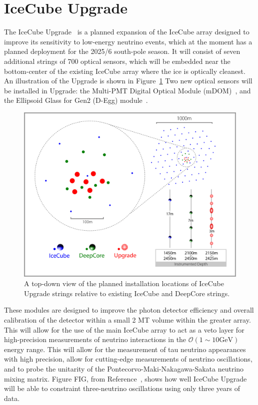 \documentclass[main.tex]{subfiles}
\begin{document}
\section{IceCube Upgrade}

The IceCube Upgrade~\cite{ishihara2019icecube} is a planned expansion of the IceCube array designed to improve its sensitivity to low-energy neutrino events, which at the moment has a planned deployment for the 2025/6 south-pole season.
It will consist of seven additional strings of 700 optical sensors, which will be embedded near the bottom-center of the existing IceCube array where the ice is optically cleanest. 
An illustration of the Upgrade is shown in Figure~\ref{fig:upgrade_layout}
Two new optical sensors will be installed in Upgrade: the Multi-PMT Digital Optical Module (mDOM)~\cite{classen2019multipmt}, and the Ellipsoid Glass for Gen2 (D-Egg) module~\cite{degg}. 


\begin{figure}
    \centering
    \includegraphics[width=0.7\linewidth]{figures/ICUpgradeLayout_V4b.jpg}
    \caption{A top-down view of the planned installation locations of IceCube Upgrade strings relative to existing IceCube and DeepCore strings.}
    \label{fig:upgrade_layout}
\end{figure}

These modules are designed to improve the photon detector efficiency and overall calibration of the detector within a small 2 MT volume within the greater array. 
This will allow for the use of the main IceCube array to act as a veto layer for high-precision measurements of neutrino interactions in the $\mathcal{O}(1\sim 10\text{GeV})$ energy range. 
This will allow for the measurement of tau neutrino appearances with high precision, allow for cutting-edge measurements of neutrino oscillations, and to probe the unitarity of the Pontecorvo-Maki-Nakagawa-Sakata neutrino mixing matrix. 
Figure FIG, from Reference~\cite{ishihara2019icecube}, shows how well IceCube Upgrade will be able to constraint three-neutrino oscillations using only three years of data. 
\end{document}
